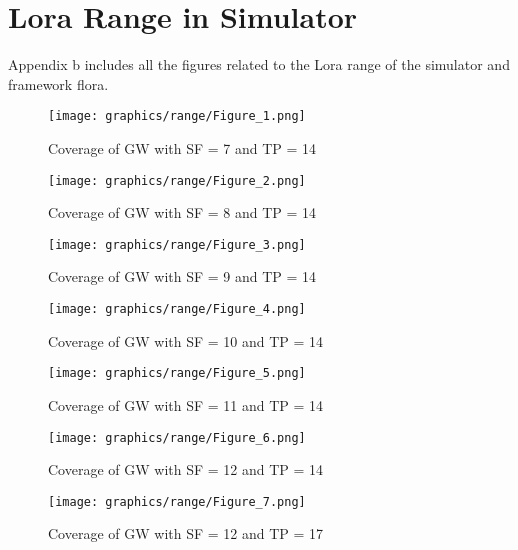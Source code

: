\chapter{Lora Range in Simulator}

Appendix b includes all the  figures related to the Lora range of the simulator and framework flora. 


\begin{figure}[H]
    \centering
      \texttt{[image: graphics/range/Figure\_1.png]}
      \caption{Coverage of GW with SF = 7 and TP = 14}
      \label{fig:fig1}
\end{figure}

\begin{figure}[H]
    \centering
      \texttt{[image: graphics/range/Figure\_2.png]}
      \caption{Coverage of GW with SF = 8 and TP = 14}
      \label{fig:fig2}
\end{figure}

\begin{figure}[H]
    \centering
      \texttt{[image: graphics/range/Figure\_3.png]}
      \caption{Coverage of GW with SF = 9 and TP = 14}
      \label{fig:fig3}
\end{figure}

\begin{figure}[H]
    \centering
      \texttt{[image: graphics/range/Figure\_4.png]}
      \caption{Coverage of GW with SF = 10 and TP = 14}
      \label{fig:fig4}
\end{figure}

\begin{figure}[H]
    \centering
      \texttt{[image: graphics/range/Figure\_5.png]}
      \caption{Coverage of GW with SF = 11 and TP = 14}
      \label{fig:fig5}
\end{figure}

\begin{figure}[H]
    \centering
      \texttt{[image: graphics/range/Figure\_6.png]}
      \caption{Coverage of GW with SF = 12 and TP = 14}
      \label{fig:fig6}
\end{figure}

\begin{figure}[H]
    \centering
      \texttt{[image: graphics/range/Figure\_7.png]}
      \caption{Coverage of GW with SF = 12 and TP = 17}
      \label{fig:fig7}
\end{figure}

